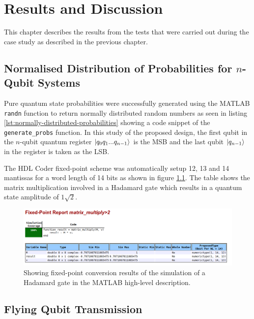\chapter{\label{ch:results} Results and Discussion}

This chapter describes the results from the tests that were carried out during the case study as described in the previous chapter. 

\section{Normalised Distribution of Probabilities for $n$-Qubit Systems}

Pure quantum state probabilities were successfully generated using the MATLAB \texttt{randn} function to return normally distributed random numbers as seen in listing \ref{lst:normally-distributed-probabilities} showing a code snippet of the \texttt{generate\_probs} function. In this study of the proposed design, the first qubit in the $n$-qubit quantum register $\ket{q_0 q_1 ... q_{n-1}}$ is the MSB and the last qubit $\ket{q_{n-1}}$ in the register is taken as the LSB. 

The HDL Coder fixed-point scheme was automatically setup 12, 13 and 14 mantissas for a word length of 14 bits as shown in figure \ref{fig:fixed-point-matrix}. The table shows the matrix multiplication involved in a Hadamard gate which results in a quantum state amplitude of $1\sqrt{2}$.

\begin{figure}[!ht]
	\centering
	\includegraphics[width=\linewidth]{body/ch6/figs/fixed-point-matrix}
	\caption[Diagram of First Iteration of the Quantum Channel.]{Showing fixed-point conversion results of the simulation of a Hadamard gate in the MATLAB high-level description.}
	\label{fig:fixed-point-matrix}
\end{figure}



\section{Flying Qubit Transmission}

